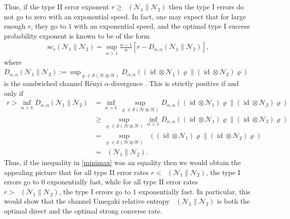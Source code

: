 \documentclass[unsortedaddress,superscriptaddress,pra,notitlepage]{revtex4}
\newcommand{\nn}{\nonumber \\}
\def\N{\mathcal{N}}
\def\S{{\mathcal S}}
\def\rho{\varrho}
\def\hil{{\mathcal H}}
\def\nn{\nonumber}
\def\sc{\mathrm{sc}}
\DeclareMathOperator{\id}{id}
\DeclareMathOperator{\DU}{\mathit{D}^{Um}}
\begin{document}
Thus, if the type II error exponent $r\ge \DU(\N_1\|\N_2)$ then the type I errors do not go to zero with an exponential speed. In fact, one may expect that for large enough $r$, they go to $1$ with an exponential speed, and the optimal 
type I success probability exponent is known to be of the form \cite{CMW,MO}
\begin{align*}
\sc_r(\N_1\|\N_2)=\sup_{\alpha>1}\frac{\alpha-1}{\alpha}\left[r-D_{\alpha,\alpha}(\N_1\|\N_2)\right],
\end{align*}
where $D_{\alpha,\alpha}(\N_1\|\N_2):=\sup_{\rho\in\S(\hil\otimes\hil)}D_{\alpha,\alpha}((\id\otimes\N_1)\rho\|(\id\otimes\N_2)\rho)$ is the sandwiched channel R\'enyi $\alpha$-divergence \cite{Renyi_new,WWY,CMW}.
This is strictly positive if and only if 
\begin{align}
r
>
\inf_{\alpha>1}D_{\alpha,\alpha}(\N_1\|\N_2)
&=
\inf_{\alpha>1}\sup_{\rho\in\S(\hil\otimes\hil)}D_{\alpha,\alpha}((\id\otimes\N_1)\rho\|(\id\otimes\N_2)\rho)\nn\\
&\ge
\sup_{\rho\in\S(\hil\otimes\hil)}\inf_{\alpha>1}D_{\alpha,\alpha}((\id\otimes\N_1)\rho\|(\id\otimes\N_2)\rho)
\label{minimax}\\
&=
\sup_{\rho\in\S(\hil\otimes\hil)}\DU((\id\otimes\N_1)\rho\|(\id\otimes\N_2)\rho)\nn\\
&=
\DU(\N_1\|\N_2).\nn
\end{align}
Thus, if the inequality in \eqref{minimax} was an equality then we would obtain 
the appealing picture that for all type II error rates $r<\DU(\N_1\|\N_2)$,
the type I errors go to $0$ exponentially fast, while for all 
type II error rates $r>\DU(\N_1\|\N_2)$,
the type I errors go to $1$ exponentially fast. 
In particular, this would show that the channel Umegaki relative entropy $\DU(\N_1\|\N_2)$
is both the optimal direct and the optimal strong converse rate.
\end{document}
